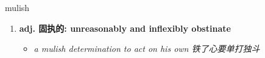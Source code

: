 
\begin{frame}
{\huge mulish}
\begin{center}
\begin{enumerate}\Large
  \item \textbf{adj. 固执的: unreasonably and inflexibly obstinate}
  \begin{itemize}
    \item \em{\Large{a mulish determination to act on his own 铁了心要单打独斗}}
  \end{itemize}
\end{enumerate}
\end{center}
\end{frame}
